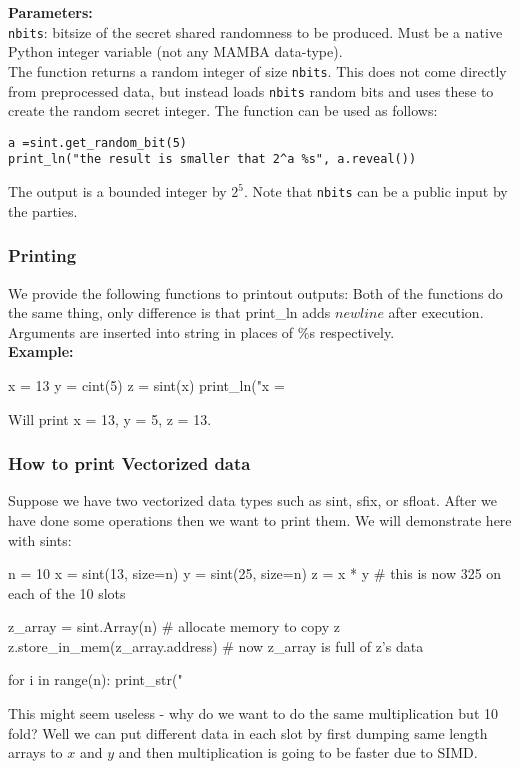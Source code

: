 \textbf{Parameters:}\\
	\verb|nbits|: bitsize of the secret shared randomness to be produced. Must be a native Python integer variable (not any MAMBA data-type).\\
\noindent
The function returns a random integer of size \verb|nbits|. This does not come directly from preprocessed data, but instead loads \verb|nbits| random bits and uses these to create the random secret integer. The function can be used as follows:
\begin{lstlisting}
a =sint.get_random_bit(5)
print_ln("the result is smaller that 2^a %s", a.reveal())
\end{lstlisting}
The output is a bounded integer by $2^5$. Note that \verb|nbits| can be a public input by the parties. 
\subsubsection{Printing}
We provide the following functions to printout outputs:
Both of the functions do the same thing, only difference is that print_ln adds $newline$ after execution. Arguments are inserted into string in places of $\%$s respectively. \\
\textbf{Example:}
\begin{mylisting}
x = 13
y = cint(5)
z = sint(x)
print_ln("x = %
\end{mylisting}
Will print x = 13, y = 5, z = 13.

\subsubsection{How to print Vectorized data}
Suppose we have two vectorized data types such as sint, sfix, or sfloat. After we have done some operations then we want to print them. We will demonstrate here with sints:

\begin{mylisting}
n = 10
x = sint(13, size=n)
y = sint(25, size=n)
z = x * y # this is now 325 on each of the 10 slots

z_array = sint.Array(n) # allocate memory to copy z
z.store_in_mem(z_array.address) # now z_array is full of z's data

for i in range(n):
	print_str("%
\end{mylisting}
This might seem useless - why do we want to do the same multiplication but 10 fold? Well we can put different data in each slot by first dumping same length arrays to $x$ and $y$ and then multiplication is going to be faster due to SIMD.


